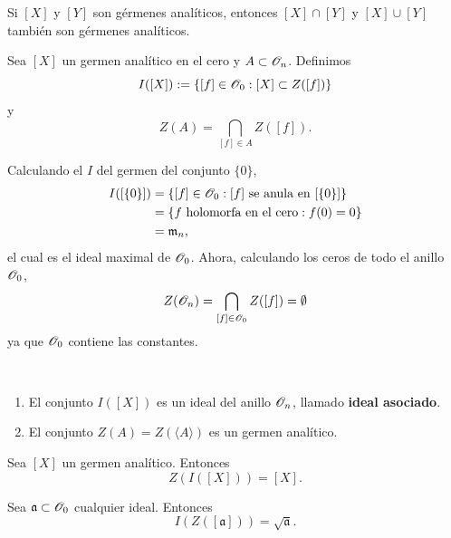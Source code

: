 \begin{propo}
	Si $[X]$ y $[Y]$  son gérmenes analíticos,  entonces $[X]\cap [Y]$ y $[X]\cup [Y]$ también son gérmenes analíticos.
\end{propo}

\begin{definition}
	Sea $[X]$ un germen analítico en el cero y $A\subset\mathscr{O}_n$. Definimos
	\begin{equation*}
		I([X]):=\{[f]\in\mathscr{O}_0:[X]\subset Z([f])\}
	\end{equation*}
	y
	\begin{equation*}
		Z(A)=\bigcap_{[f]\in A}Z([f]).
	\end{equation*}
\end{definition}

\begin{example}
	Calculando el $I$ del germen del conjunto $\{0\}$,
	\begin{align*}
		I([\{0\}])&=\{[f]\in\mathscr{O}_0:[f]\text{ se anula  en }[\{0\}]\}\\
		&=\{f\text{ holomorfa en el cero}:f(0)=0\}\\
		&=\mathfrak{m}_n,
	\end{align*}
	el cual es el ideal maximal de $\mathscr{O}_0$.
	Ahora, calculando los ceros de todo el anillo $\mathscr{O}_0$,
	\begin{equation*}
		Z(\mathscr{O}_n)=\bigcap_{[f]\in\mathscr{O}_0}Z([f])=\emptyset
	\end{equation*}
	ya que $\mathscr{O}_0$ contiene las constantes.
\end{example}


\begin{propo} $ $
	\begin{enumerate}
		\item El conjunto $I([X])$ es un ideal del anillo $\mathscr{O}_n$, llamado \textbf{ideal asociado}.
		\item El conjunto $Z(A)=Z(\langle A\rangle)$ es  un germen analítico.
	\end{enumerate}
\end{propo}

\begin{propo}
	Sea $[X]$ un germen analítico. Entonces
	\begin{equation*}
		Z(I([X]))=[X].
	\end{equation*}
\end{propo}

\begin{theorem}[de Rückert]
	Sea $\mathfrak{a}\subset\mathscr{O}_0$ cualquier ideal. Entonces
	\begin{equation*}
		I(Z([\mathfrak{a}]))=\sqrt{\mathfrak{a}}.
	\end{equation*}
\end{theorem}

